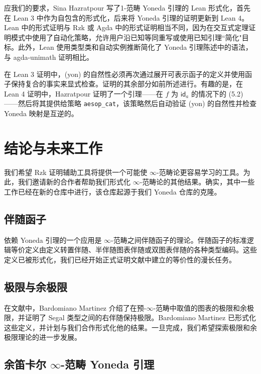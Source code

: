 \documentclass[12pt,a4paper]{article}
\theoremstyle{definition}
\theoremstyle{definition}
\begin{document}
应我们的要求，Sina Hazratpour 写了1-范畴 Yoneda 引理的 Lean 形式化，首先在 Lean 3 中作为自包含的形式化，后来将 Yoneda 引理的证明更新到 Lean 4。Lean 中的形式证明与 Rzk 或 Agda 中的形式证明相当不同，因为在交互式定理证明模式中使用了自动化策略，允许用户沿已知等同重写或使用已知引理``简化"目标。此外，Lean 使用类型类和自动实例推断简化了 Yoneda 引理陈述中的语法，与 agda-unimath 证明相比。

在 Lean 3 证明中，(yon) 的自然性必须再次通过展开可表示函子的定义并使用函子保持复合的事实来显式检查。证明的其余部分如前所述进行。有趣的是，在 Lean 4 证明中，Hazratpour 证明了一个引理——在 $f$ 为 $\mathsf{id}_a$ 的情况下的 (5.2)——然后将其提供给策略 \texttt{aesop\_cat}，该策略然后自动验证 (yon) 的自然性并检查 Yoneda 映射是互逆的。

\section{结论与未来工作}

我们希望 Rzk 证明辅助工具将提供一个可能使 $\infty$-范畴论更容易学习的工具。为此，我们邀请新的合作者帮助我们形式化 $\infty$-范畴论的其他结果。确实，其中一些工作已经在新的仓库中进行，该仓库起源于我们 Yoneda 仓库的克隆。

\subsection{伴随函子}

依赖 Yoneda 引理的一个应用是 $\infty$-范畴之间伴随函子的理论。伴随函子的标准逻辑等价定义由定义转置伴随、半伴随图表伴随或双图表伴随的各种类型编码。这些定义已被形式化，我们已经开始正式证明文献中建立的等价性的漫长任务。

\subsection{极限与余极限}

在文献中，Bardomiano Martinez 介绍了在预-$\infty$-范畴中取值的图表的极限和余极限，并证明了 Segal 类型之间的右伴随保持极限。Bardomiano Martinez 已形式化这些定义，并计划与我们合作形式化他的结果。一旦完成，我们希望探索极限和余极限理论的进一步发展。

\subsection{余笛卡尔 $\infty$-范畴 Yoneda 引理}
\end{document}
